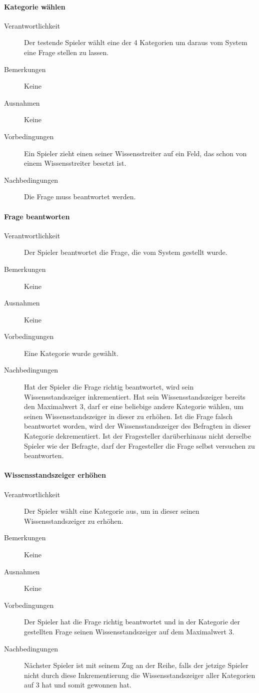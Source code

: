 \documentclass{report}
\begin{document}
\paragraph{Kategorie wählen}
\begin{description}
	\item[Verantwortlichkeit] Der testende Spieler wählt eine der 4 Kategorien um daraus vom System eine Frage stellen zu lassen.
	\item[Bemerkungen] Keine
	\item[Ausnahmen] Keine
	\item[Vorbedingungen] Ein Spieler zieht einen seiner Wissensstreiter auf ein Feld, das schon von einem Wissensstreiter besetzt ist.
	\item[Nachbedingungen] Die Frage muss beantwortet werden.
\end{description}

\paragraph{Frage beantworten}
\begin{description}
	\item[Verantwortlichkeit] Der Spieler beantwortet die Frage, die vom System gestellt wurde.
	\item[Bemerkungen] Keine
	\item[Ausnahmen] Keine
	\item[Vorbedingungen] Eine Kategorie wurde gewählt.
	\item[Nachbedingungen] Hat der Spieler die Frage richtig beantwortet, wird sein Wissensstandszeiger inkrementiert. Hat sein Wissensstandszeiger bereits den Maximalwert 3, darf er eine beliebige andere Kategorie wählen, um seinen Wissensstandszeiger in dieser zu erhöhen. Ist die Frage falsch beantwortet worden, wird der Wissensstandszeiger des Befragten in dieser Kategorie dekrementiert. Ist der Fragesteller darüberhinaus nicht derselbe Spieler wie der Befragte, darf der Fragesteller die Frage selbst versuchen zu beantworten.
\end{description}

\paragraph{Wissensstandszeiger erhöhen}
\begin{description}
	\item[Verantwortlichkeit] Der Spieler wählt eine Kategorie aus, um in dieser seinen Wissensstandszeiger zu erhöhen.
	\item[Bemerkungen] Keine
	\item[Ausnahmen] Keine
	\item[Vorbedingungen] Der Spieler hat die Frage richtig beantwortet und in der Kategorie der gestellten Frage seinen Wissensstandszeiger auf dem Maximalwert 3.
	\item[Nachbedingungen] Nächster Spieler ist mit seinem Zug an der Reihe, falls der jetzige Spieler nicht durch diese Inkrementierung die Wissensstandszeiger aller Kategorien auf 3 hat und somit gewonnen hat.
\end{description}
\end{document}
